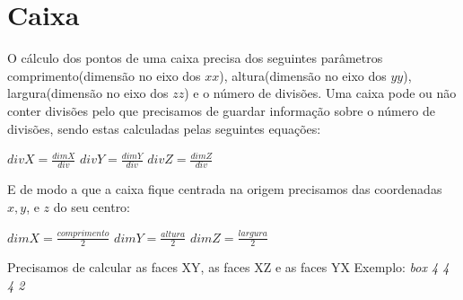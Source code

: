 \documentclass{article}
\begin{document}
\section{Caixa}
O cálculo dos pontos de uma caixa precisa dos seguintes parâmetros comprimento(dimensão no eixo dos $xx$), altura(dimensão no eixo dos $yy$), largura(dimensão no eixo dos $zz$) e o número de divisões. 
Uma caixa pode ou não conter divisões pelo que precisamos de guardar informação sobre o número de divisões, sendo estas calculadas pelas seguintes equações:
\begin{center}
$divX = \frac{dimX}{div}$ \newline\newline
$divY = \frac{dimY}{div}$ \newline\newline
$divZ = \frac{dimZ}{div}$ \newline\newline
\end{center}
E de modo a que a caixa fique centrada na origem precisamos das coordenadas $x,y$, e $z$ do seu centro:
\begin{center}
$dimX = \frac{comprimento}{2}$ \newline\newline
$dimY = \frac{altura}{2}$ \newline\newline
$dimZ = \frac{largura}{2}$ \newline\newline
\end{center}
Precisamos de calcular as faces XY, as faces XZ e as faces YX\newline
Exemplo: \textit{box 4 4 4 2}
\end{document}
